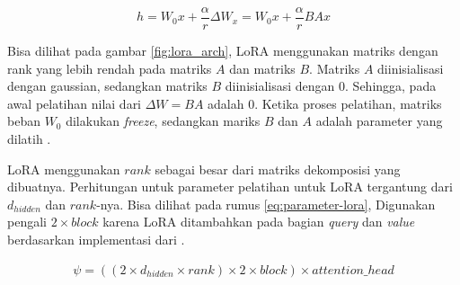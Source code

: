 \begin{equation}
    h = W_{0}x + \frac{\alpha}{r}\Delta{W_x} = W_{0}x + \frac{\alpha}{r}BAx
    \label{eq:lora-pass}
\end{equation}

Bisa dilihat pada gambar \ref{fig:lora_arch}, LoRA menggunakan matriks dengan rank yang lebih rendah pada matriks $A$ dan matriks $B$. Matriks $A$ diinisialisasi dengan gaussian, sedangkan matriks $B$ diinisialisasi dengan 0. Sehingga, pada awal pelatihan nilai dari $\Delta{W}=BA$ adalah 0. Ketika proses pelatihan, matriks beban $W_0$ dilakukan \textit{freeze}, sedangkan mariks $B$ dan $A$ adalah parameter yang dilatih \parencite{lora}.

LoRA menggunakan $rank$ sebagai besar dari matriks dekomposisi yang dibuatnya. Perhitungan untuk parameter pelatihan untuk LoRA tergantung dari $d_{hidden}$ dan $rank$-nya. Bisa dilihat pada rumus \ref{eq:parameter-lora}, Digunakan pengali $2 \times block$ karena LoRA ditambahkan pada bagian \textit{query} dan \textit{value} berdasarkan implementasi dari \citeauthor{adapters}.

\begin{equation}
    \begin{aligned}
        \psi = ((2 \times d_{hidden} \times rank) \times 2 \times block) \times attention\_head
    \end{aligned}
    \label{eq:parameter-lora}
\end{equation}

\begin{table}[ht]
    \vspace{0.25cm}
    \centering
    \caption{Hasil evaluasi LoRA dengan model GPT-3 \parencite{lora}}
    \label{table:lora_result}
\end{table}

